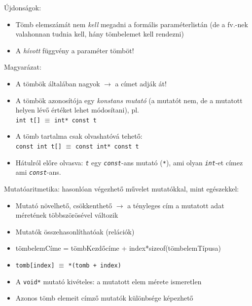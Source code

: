 \documentclass[usenames,dvipsnames,aspectratio=169]{beamer}
\begin{document}
\begin{frame}
  Újdonságok:
  \begin{itemize}
    \item Tömb elemszámát nem \emph{kell} megadni a formális paraméterlistán (de a fv.-nek valahonnan tudnia kell, hány tömbelemet kell rendezni)
    \item A \emph{hívott} függvény  a paraméter tömböt!
  \end{itemize}
  Magyarázat:
  \begin{itemize}
    \item A tömbök általában nagyok $\to$  a címet adják át!
    \item A tömbök azonosítója egy \emph{konstans mutató} (a mutatót nem, de a mutatott helyen lévő értéket lehet módosítani), pl.\\ 
    \texttt{int t[]} $\equiv$ \texttt{int* const t}
    \item A tömb tartalma csak olvashatóvá tehető: \\ 
    \texttt{const int t[]} $\equiv$ \texttt{const int* const t}
    \item Hátulról előre olvasva: \emph{\texttt{t}} egy \emph{\texttt{const}}-ans mutató (\emph{\texttt{*}}), ami olyan \emph{\texttt{int}}-et címez ami \emph{\texttt{const}}-ans.
  \end{itemize}
\end{frame}

\begin{frame}
  \begin{exampleblock}{}
    \vspace{-.2cm}
    \footnotesize
    
    \vspace{-.2cm}
  \end{exampleblock}
\end{frame}

\begin{frame}
  Mutatóaritmetika: hasonlóan végezhető művelet mutatókkal, mint egészekkel:
  \begin{itemize}
    \item Mutató növelhető, csökkenthető $\to$ a tényleges cím a mutatott adat méretének többszörösével változik
    \item Mutatók összehasonlíthatóak (relációk)
    \item tömbelemCíme = tömbKezdőcíme + index*sizeof(tömbelemTípusa)
    \item \texttt{tomb[index]} $\equiv$ \texttt{*(tomb + index)}
    \item A \texttt{void*} mutató kivételes: a mutatott elem mérete ismeretlen
    \item Azonos tömb elemeit címző mutatók különbsége képezhető
  \end{itemize}
\end{frame}
\end{document}
